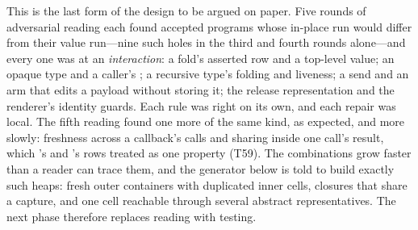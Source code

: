 This is the last form of the design to be argued on paper. Five rounds of adversarial reading each found
accepted programs whose in-place run would differ from their value run---nine such holes in the third and
fourth rounds alone---and every one was at an \emph{interaction}: a fold's asserted row and a top-level
value; an opaque type and a caller's \Disjoint; a recursive type's folding and liveness; a send and an arm
that edits a payload without storing it; the release representation and the renderer's identity guards.
Each rule was right on its own, and each repair was local. The fifth reading found one more of the same
kind, as expected, and more slowly: freshness across a callback's calls and sharing inside one call's
result, which 's and 's rows treated as one property (T59). The combinations
grow faster than a reader can trace them, and the generator below is told to build exactly such heaps:
fresh outer containers with duplicated inner cells, closures that share a capture, and one cell reachable
through several abstract representatives. The next phase therefore replaces reading with testing.
